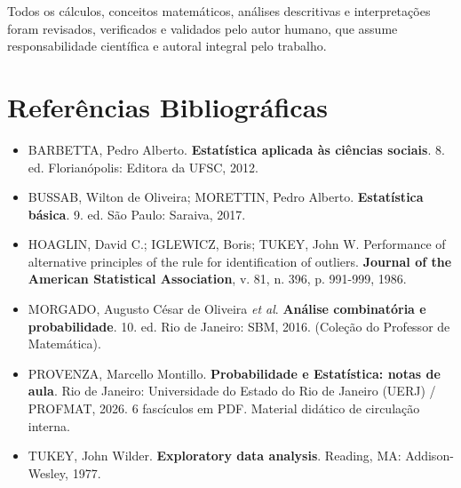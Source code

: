 \documentclass[12pt,a4paper]{article}
\begin{document}
Todos os cálculos, conceitos matemáticos, análises descritivas e interpretações foram revisados, verificados e validados pelo autor humano, que assume responsabilidade científica e autoral integral pelo trabalho.

\section{Referências Bibliográficas}
\begin{itemize}
    \item BARBETTA, Pedro Alberto. \textbf{Estatística aplicada às ciências sociais}. 8. ed. Florianópolis: Editora da UFSC, 2012.
    \item BUSSAB, Wilton de Oliveira; MORETTIN, Pedro Alberto. \textbf{Estatística básica}. 9. ed. São Paulo: Saraiva, 2017.
    \item HOAGLIN, David C.; IGLEWICZ, Boris; TUKEY, John W. Performance of alternative principles of the rule for identification of outliers. \textbf{Journal of the American Statistical Association}, v. 81, n. 396, p. 991-999, 1986.
    \item MORGADO, Augusto César de Oliveira \textit{et al}. \textbf{Análise combinatória e probabilidade}. 10. ed. Rio de Janeiro: SBM, 2016. (Coleção do Professor de Matemática).
    \item PROVENZA, Marcello Montillo. \textbf{Probabilidade e Estatística: notas de aula}. Rio de Janeiro: Universidade do Estado do Rio de Janeiro (UERJ) / PROFMAT, 2026. 6 fascículos em PDF. Material didático de circulação interna.
    \item TUKEY, John Wilder. \textbf{Exploratory data analysis}. Reading, MA: Addison-Wesley, 1977.
\end{itemize}
\end{document}
